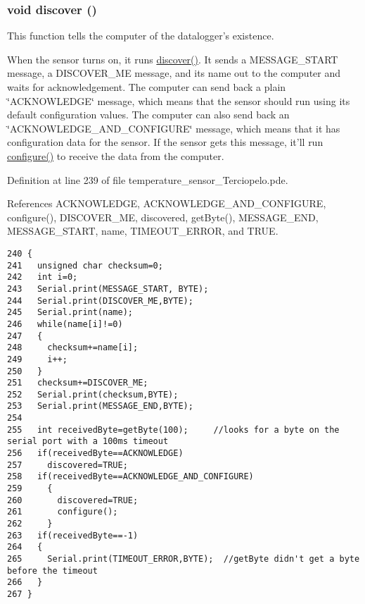 \hypertarget{temperature__sensor___terciopelo_8pde_3fdb2350c3f98c0de0f0ae3c831a8b14}{
\subsubsection[{discover}]{\setlength{\rightskip}{0pt plus 5cm}void discover ()}}
\label{temperature__sensor___terciopelo_8pde_3fdb2350c3f98c0de0f0ae3c831a8b14}


This function tells the computer of the datalogger's existence. 

When the sensor turns on, it runs \hyperlink{nublogger_8h_3fdb2350c3f98c0de0f0ae3c831a8b14}{discover()}. It sends a MESSAGE\_\-START message, a DISCOVER\_\-ME message, and its name out to the computer and waits for acknowledgement. The computer can send back a plain \char`\"{}ACKNOWLEDGE\char`\"{} message, which means that the sensor should run using its default configuration values. The computer can also send back an \char`\"{}ACKNOWLEDGE\_\-AND\_\-CONFIGURE\char`\"{} message, which means that it has configuration data for the sensor. If the sensor gets this message, it'll run \hyperlink{nublogger_8h_e369b3765489ee8bd0ea791c1843630f}{configure()} to receive the data from the computer. 

Definition at line 239 of file temperature\_\-sensor\_\-Terciopelo.pde.

References ACKNOWLEDGE, ACKNOWLEDGE\_\-AND\_\-CONFIGURE, configure(), DISCOVER\_\-ME, discovered, getByte(), MESSAGE\_\-END, MESSAGE\_\-START, name, TIMEOUT\_\-ERROR, and TRUE.

\begin{Code}\begin{verbatim}240 { 
241   unsigned char checksum=0;
242   int i=0;
243   Serial.print(MESSAGE_START, BYTE);
244   Serial.print(DISCOVER_ME,BYTE);
245   Serial.print(name);
246   while(name[i]!=0)
247   {
248     checksum+=name[i];
249     i++;
250   }
251   checksum+=DISCOVER_ME;
252   Serial.print(checksum,BYTE);
253   Serial.print(MESSAGE_END,BYTE);
254 
255   int receivedByte=getByte(100);     //looks for a byte on the serial port with a 100ms timeout
256   if(receivedByte==ACKNOWLEDGE)
257     discovered=TRUE;
258   if(receivedByte==ACKNOWLEDGE_AND_CONFIGURE)
259     {
260       discovered=TRUE;
261       configure();
262     }
263   if(receivedByte==-1)
264   {
265     Serial.print(TIMEOUT_ERROR,BYTE);  //getByte didn't get a byte before the timeout
266   }  
267 }
\end{verbatim}
\end{Code}


